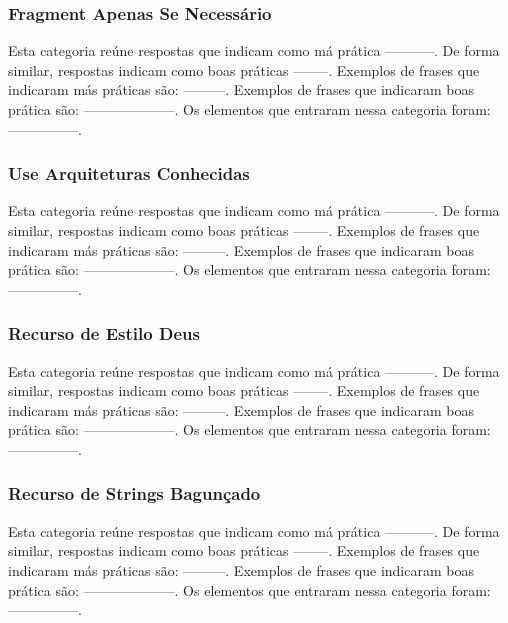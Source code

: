 \subsubsection{Fragment Apenas Se Necess\'ario}
Esta categoria re\'une respostas que indicam como m\'a pr\'atica -----------. De forma similar, respostas indicam como boas pr\'aticas --------. Exemplos de frases que indicaram m\'as pr\'aticas s\~ao: ---------. Exemplos de frases que indicaram boas pr\'atica s\~ao: --------------------. Os elementos que entraram nessa categoria foram: ---------------. 

\subsubsection{Use Arquiteturas Conhecidas}
Esta categoria re\'une respostas que indicam como m\'a pr\'atica -----------. De forma similar, respostas indicam como boas pr\'aticas --------. Exemplos de frases que indicaram m\'as pr\'aticas s\~ao: ---------. Exemplos de frases que indicaram boas pr\'atica s\~ao: --------------------. Os elementos que entraram nessa categoria foram: ---------------. 

\subsubsection{Recurso de Estilo Deus}
Esta categoria re\'une respostas que indicam como m\'a pr\'atica -----------. De forma similar, respostas indicam como boas pr\'aticas --------. Exemplos de frases que indicaram m\'as pr\'aticas s\~ao: ---------. Exemplos de frases que indicaram boas pr\'atica s\~ao: --------------------. Os elementos que entraram nessa categoria foram: ---------------. 

\subsubsection{Recurso de Strings Bagun\c{c}ado}
Esta categoria re\'une respostas que indicam como m\'a pr\'atica -----------. De forma similar, respostas indicam como boas pr\'aticas --------. Exemplos de frases que indicaram m\'as pr\'aticas s\~ao: ---------. Exemplos de frases que indicaram boas pr\'atica s\~ao: --------------------. Os elementos que entraram nessa categoria foram: ---------------. 

